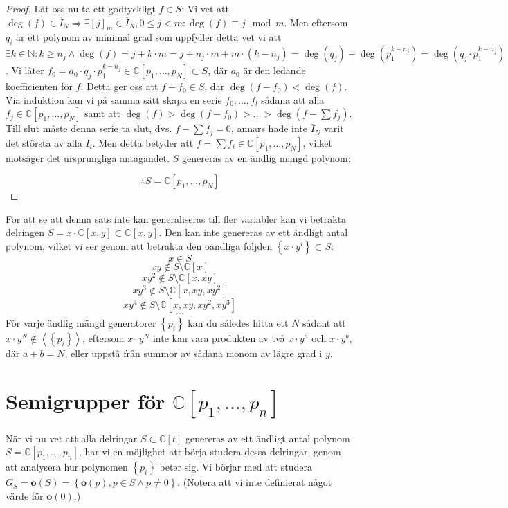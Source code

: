 \begin{proof}
Låt oss nu ta ett godtyckligt $f \in S$: Vi vet att $\deg(f)\in \overline{I}_N \Longrightarrow \exists [j]_m \in \overline{I}_N, 0 \leq j < m : \deg(f) \equiv j \mod{m}$. Men eftersom $q_i$ är ett polynom av minimal grad som uppfyller detta vet vi att $\exists k \in \mathbb{N} : k\geq n_j \wedge \deg(f) = j + k\cdot m = j + n_j\cdot m + m\cdot(k-n_j) =\deg(q_j)+\deg(p_1^{k-n_j}) = \deg(q_j\cdot p_1^{k-n_j})$. Vi låter $f_0 = a_0\cdot q_j\cdot p_1^{k-n_j} \in \mathbb{C}[p_1,\ldots,p_N] \subset S$, där $a_0$ är den ledande koefficienten för $f$. Detta ger oss att $f-f_0 \in S$, där $\deg(f-f_0)<\deg(f)$. Via induktion kan vi på samma sätt skapa en serie $f_0,\ldots,f_l$ sådana att alla $f_j\in \mathbb{C}[p_1,\ldots,p_N]$ samt att $\deg(f)>\deg(f-f_0)>\ldots>\deg(f-\sum f_j)$. Till slut måste denna serie ta slut, dvs. $f-\sum f_j=0$, annars hade inte $\overline{I}_N$ varit det största av alla $\overline{I}_i$. Men detta betyder att $f = \sum f_i \in \mathbb{C}[p_1,\ldots,p_N]$, vilket motsäger det ursprungliga antagandet. $S$ genereras av en ändlig mängd polynom:

\[\therefore S=\mathbb{C}[p_1,\ldots,p_N]\]
\end{proof}

För att se att denna sats inte kan generaliseras till fler variabler kan vi betrakta delringen $S=x\cdot\mathbb{C}[x,y]\subset\mathbb{C}[x,y]$. Den kan inte genereras av ett ändligt antal polynom, vilket vi ser genom att betrakta den oändliga följden $\left\{x\cdot y^i\right\} \subset S$:
\[x\in S \]
\[xy \notin S\setminus\mathbb{C}[x] \]
\[xy^2 \notin S\setminus\mathbb{C}[x,xy] \]
\[xy^3 \notin S\setminus\mathbb{C}[x,xy,xy^2] \]
\[xy^4 \notin S\setminus\mathbb{C}[x,xy,xy^2,xy^3] \]
\[\cdots\]
För varje ändlig mängd generatorer $\left\{p_i\right\}$ kan du således hitta ett $N$ sådant att $x\cdot y^N \notin \left<\left\{p_i\right\}\right>$, eftersom $x\cdot y^N$ inte kan vara produkten av två $x\cdot y^a$ och $x\cdot y^b$, där $a + b = N$, eller uppstå från summor av sådana monom av lägre grad i $y$.

\section{Semigrupper för $\mathbb{C}[p_1,\ldots,p_n]$}

När vi nu vet att alla delringar $S \subset \mathbb{C}[t]$ genereras av ett ändligt antal polynom $S=\mathbb{C}[p_1,\ldots,p_n]$, har vi en möjlighet att börja studera dessa delringar, genom att analysera hur polynomen $\left\{p_i\right\}$ beter sig. Vi börjar med att studera $G_S = \mathbf{o}(S) = \left\{\mathbf{o}(p), p \in S \wedge p \neq 0 \right\}$. (Notera att vi inte definierat något värde för $\mathbf{o}(0)$.)

